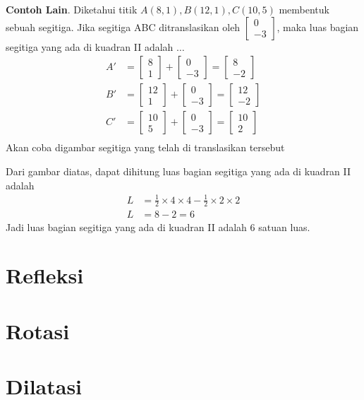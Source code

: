 \documentclass{article}
\begin{document}
\textbf{Contoh Lain}. Diketahui titik $A(8,1),B(12,1),C(10,5)$ membentuk sebuah segitiga. Jika segitiga ABC ditranslasikan oleh $\begin{bmatrix}
    0\\-3
\end{bmatrix}$, maka luas bagian segitiga yang ada di kuadran II adalah $\dots$
\[
\begin{aligned}
    A'&=\begin{bmatrix}
        8\\1
    \end{bmatrix}+\begin{bmatrix}
        0\\-3
    \end{bmatrix}=\begin{bmatrix}
        8\\-2
    \end{bmatrix}\\
    B'&=\begin{bmatrix}
        12\\1
    \end{bmatrix}+\begin{bmatrix}
        0\\-3
    \end{bmatrix}=\begin{bmatrix}
        12\\-2
    \end{bmatrix}\\
    C'&=\begin{bmatrix}
        10\\5
    \end{bmatrix}+\begin{bmatrix}
        0\\-3
    \end{bmatrix}=\begin{bmatrix}
        10\\2
    \end{bmatrix}\\
\end{aligned}
\]
Akan coba digambar segitiga yang telah di translasikan tersebut

Dari gambar diatas, dapat dihitung luas bagian segitiga yang ada di kuadran II adalah
\[
\begin{aligned}
    L&=\frac{1}{2}\times 4 \times4-\frac{1}{2}\times2\times2\\
    L&=8-2=6
\end{aligned}
\]
Jadi luas bagian segitiga yang ada di kuadran II adalah 6 satuan luas.
\section{Refleksi}
\section{Rotasi}
\section{Dilatasi}
\end{document}
